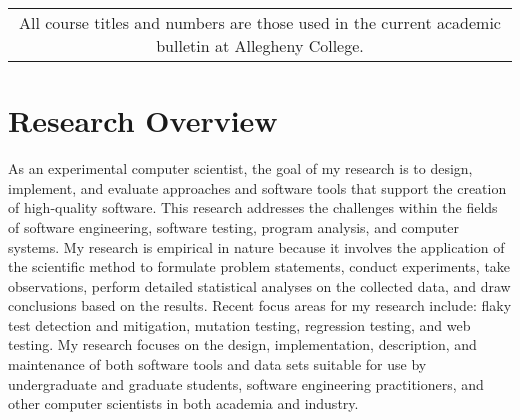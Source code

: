 \documentclass[11pt,letterpaper,sans]{moderncv}
\begin{document}

{\small
  \setlength\tabcolsep{6pt}
  \begin{tabular}{c}
    All course titles and numbers are those used in the current academic
    bulletin at Allegheny College.
\end{tabular} }

\vspace*{-.1in}
%
\section{Research Overview}


{\small
  As an experimental computer scientist, the goal of my research is to design,
  implement, and evaluate approaches and software tools that support the
  creation of high-quality software. This research addresses the challenges
  within the fields of software engineering, software testing, program analysis,
  and computer systems. My research is empirical in nature because it involves
  the application of the scientific method to formulate problem statements,
  conduct experiments, take observations, perform detailed statistical analyses
  on the collected data, and draw conclusions based on the results. Recent
  focus areas for my research include: flaky test detection and mitigation,
  mutation testing, regression testing, and web testing. My research
  focuses on the design, implementation, description, and maintenance of both
  software tools and data sets suitable for use by undergraduate and
  graduate students, software engineering practitioners, and other computer
  scientists in both academia and industry.
}

\vspace*{.1in}

\end{document}

